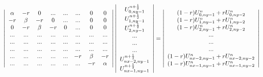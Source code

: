 \[
\left| 
\begin{array}{ccc ccccc}
\alpha & -r      & 0     & ...  & ...  & ...  & 0       & 0      \\
-r     & \beta   & -r    & 0    & ...  & ...  & 0       & 0      \\
0      &  -r     &\beta  & -r   & 0    & ...  & 0       & 0      \\
...    & ...     & ...   & ...  & ...  & ...  & ...     & ...    \\
...    & ...     & ...   & ...  & ...  & ...  & ...     & ...    \\
...    & ...     & ...   & ...  & ...  & ...  & ...     & ...    \\
...    & ...     & ...   & ...  & ...  & -r   & \beta   & -r     \\
...    & ...     & ...   & ...  & ...  & ...  & -r      & \alpha \\
\end{array} 
\right|
\left| 
\begin{array}{c}
U_{0,ny-1}^{n+\frac{1}{2}} \\
U_{1,ny-1}^{n+\frac{1}{2}} \\
U_{2,ny-1}^{n+\frac{1}{2}} \\
...\\
...\\
...\\
U_{nx-2,ny-1}^{n+\frac{1}{2}} \\
U_{nx-1,ny-1}^{n+\frac{1}{2}} \\
\end{array} 
\right|
=
\left| 
\begin{array}{c}
(1-r)U_{0,ny-1}^{n} + rU_{0,ny-2}^{n} \\
(1-r)U_{1,ny-1}^{n} + rU_{1,ny-2}^{n} \\
(1-r)U_{2,ny-1}^{n} + rU_{2,ny-2}^{n} \\
...\\
...\\
...\\
(1-r)U_{nx-2,ny-1}^{n} + rU_{nx-2,ny-2}^{n} \\
(1-r)U_{nx-1,ny-1}^{n} + rU_{nx-1,ny-2}^{n} \\
\end{array} 
\right|
\]

